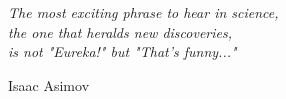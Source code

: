 
\cleardoublepage

\thispagestyle{empty}
\null\vfill\vfill

{\centering
\parbox{10 cm}{%
  \raggedright{\Large\itshape%
  The most exciting phrase to hear in science,\\
  the one that heralds new discoveries,\\
  is not "Eureka!" but "That's funny..."\par\bigskip
  }   
  \raggedleft\Large{Isaac Asimov}\par%
}
}
\vfill\vfill

\cleardoublepage


